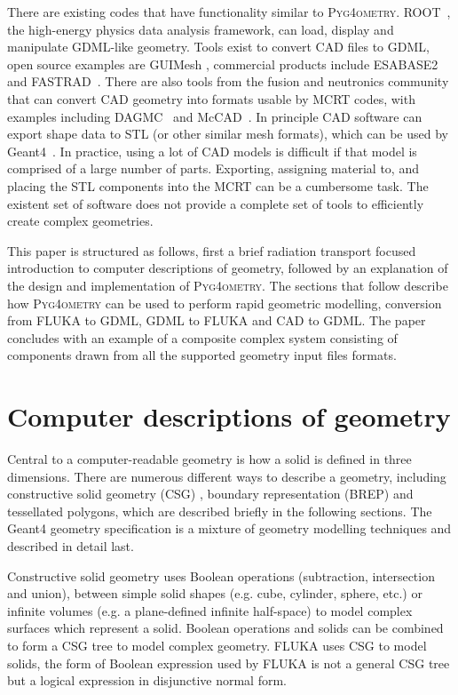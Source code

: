 \documentclass[final,5p,times,twocolumn]{elsarticle}
\newcommand{\PYGEOMETRY}{\textsc{Pyg4ometry}}
\begin{document}
There are existing codes that have functionality similar to \PYGEOMETRY{}. ROOT~\cite{Brun:1997pa}, the high-energy physics data analysis framework, 
can load, display and manipulate GDML-like geometry. Tools exist to convert CAD files to GDML, open source examples are GUIMesh \cite{GUIMesh_Pinto}, commercial 
products include ESABASE2~\cite{ESABASE2} and FASTRAD~\cite{FASTRAD}. There are also tools from the fusion and neutronics community that can convert CAD 
geometry into formats usable by MCRT codes, with examples including DAGMC~\cite{DAGMC} and McCAD~\cite{McCad}. In principle CAD software can export shape data to STL 
(or other similar mesh formats), which can be used by Geant4~\cite{poole2012acad}. In practice, using a lot of CAD models is difficult if that model is comprised of a 
large number of parts. Exporting, assigning material to, and placing the STL components into the MCRT can be a cumbersome task. The existent set of software does not 
provide a complete set of tools to efficiently create complex geometries.

This paper is structured as follows, first a brief radiation transport focused introduction to computer descriptions of geometry, followed by an explanation of the design 
and implementation of \PYGEOMETRY{}. The sections that follow describe how \PYGEOMETRY{} can be used to perform rapid geometric modelling, conversion from 
FLUKA to GDML, GDML to FLUKA and CAD to GDML. The paper concludes with an example of a composite complex system consisting of components drawn from 
all the supported  geometry input files formats.

\section{Computer descriptions of geometry} \label{sec:geometric}
Central to a computer-readable geometry is how a solid is defined in three dimensions. There are numerous different ways to describe a
geometry, including constructive solid geometry (CSG) , boundary representation (BREP) and tessellated polygons, which are described 
briefly in the following sections.  The Geant4 geometry specification is a mixture of geometry modelling techniques and described in detail last.

Constructive solid geometry uses Boolean operations (subtraction, intersection and union), between simple solid shapes (e.g. cube, cylinder, sphere, etc.) or infinite
volumes (e.g. a plane-defined infinite half-space) to model complex surfaces which represent a solid. Boolean operations and solids can be combined to form a 
CSG tree to model complex geometry. FLUKA uses CSG to model solids, the form of Boolean expression used by FLUKA is not a general CSG tree but a 
logical expression in disjunctive normal form.
\end{document}
